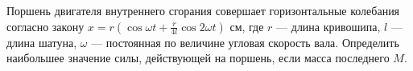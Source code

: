 Поршень двигателя внутреннего сгорания совершает горизонтальные колебания
согласно закону $x = r(\cos{\omega t}+\frac{r}{4l}\cos{2\omega t})$ см,
где $r$ --- длина кривошипа, $l$ --- длина шатуна,
$\omega$ --- постоянная по величине угловая скорость вала.
Определить наибольшее значение силы, действующей на поршень,
если масса последнего $M$.
